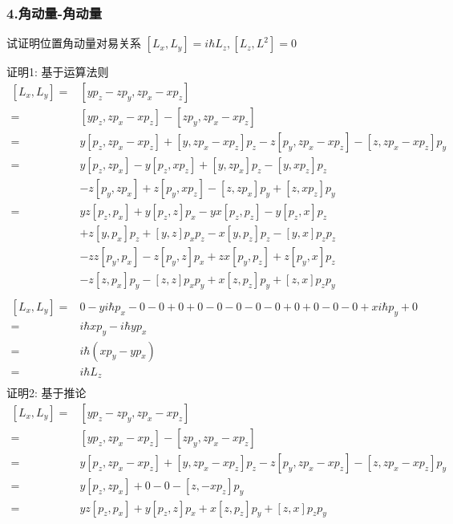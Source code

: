 \begin{frame} [allowframebreaks=]
    \frametitle{4.角动量-角动量}
    \begin{exampleblock}{}
     试证明位置角动量对易关系 $[L_x,L_y]=i\hbar L_z,  [L_z, L^2]= 0$
    \end{exampleblock}
    \alert{证明1:} 基于运算法则
    \begin{equation*}
        \begin{split}
        [L_x,L_y]= &[yp_z-zp_y,zp_x-xp_z]\\
        =&[yp_z,zp_x-xp_z] - [zp_y,zp_x-xp_z]\\
        =&y[p_z,zp_x-xp_z]+[y,zp_x-xp_z]p_z- z[p_y,zp_x-xp_z]-[z,zp_x-xp_z]p_y\\
        =&y[p_z,zp_x]-y[p_z,xp_z]+[y,zp_x]p_z-[y,xp_z]p_z \\ &-z[p_y,zp_x] +z[p_y,xp_z]- [z,zp_x]p_y+[z,xp_z]p_y\\
        =&yz[p_z,p_x]+y[p_z,z]p_x-yx[p_z,p_z]-y[p_z,x]p_z \\ & +z[y,p_x]p_z+[y,z]p_xp_z-x[y,p_z]p_z -[y,x]p_zp_z \\ & -zz[p_y,p_x] -z[p_y,z]p_x +zx[p_y,p_z] +z[p_y,x]p_z \\ & -z[z,p_x]p_y -[z,z]p_xp_y+x[z,p_z]p_y +[z,x]p_zp_y\\  
    \end{split}  
    \end{equation*}
    \begin{equation*}
        \begin{split}
        [L_x,L_y]=&0-yi\hbar p_x-0-0+0+0-0 -0-0 -0 +0 +0-0 -0+xi\hbar p_y +0\\
        =&i\hbar xp_y-i\hbar y p_x\\
        =&i\hbar (xp_y-y p_x)\\
        =&i\hbar L_z\\    
    \end{split}  
    \end{equation*}
    \alert{证明2:} 基于推论 
    \begin{equation*}
        \begin{split}
        [L_x,L_y]= &[yp_z-zp_y,zp_x-xp_z]\\
        =&[yp_z,zp_x-xp_z] - [zp_y,zp_x-xp_z]\\
        =&y[p_z,zp_x-xp_z]+[y,zp_x-xp_z]p_z- z[p_y,zp_x-xp_z]-[z,zp_x-xp_z]p_y\\
        =&y[p_z,zp_x]+0- 0-[z,-xp_z]p_y\\
        =&yz[p_z,p_x]+y[p_z,z]p_x+x[z,p_z]p_y+[z,x]p_zp_y\\

\end{split}
\end{equation*}
\end{frame}
